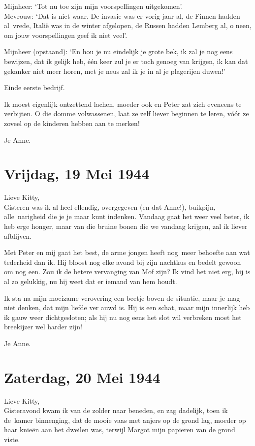 \documentclass{book}
\begin{document}
Mijnheer: `Tot nu toe zijn mijn voorspellingen uitgekomen'.\\Mevrouw:
`Dat is niet waar. De invasie was er vorig jaar al, de Finnen hadden
al~vrede, Italië was in de winter afgelopen, de Russen hadden Lemberg
al, o neen, om jouw voorspellingen geef ik niet veel'.

Mijnheer (opstaand): `En hou je nu eindelijk je grote bek, ik zal je nog
eens bewijzen, dat ik gelijk heb, één keer zul je er toch genoeg van
krijgen, ik kan dat gekanker niet meer horen, met je neus zal ik je in
al je plagerijen duwen!'

Einde eerste bedrijf.

Ik moest eigenlijk ontzettend lachen, moeder ook en Peter zat zich
eveneens te verbijten. O die domme volwassenen, laat ze zelf liever
beginnen te leren, vóór ze zoveel op de kinderen hebben aan te merken!

Je Anne.

\chapter{Vrijdag, 19 Mei 1944}

Lieve Kitty,\\Gisteren was ik al heel ellendig, overgegeven (en dat
Anne!), buikpijn, alle~narigheid die je je maar kunt indenken. Vandaag
gaat het weer veel beter, ik heb erge honger, maar van die bruine bonen
die we vandaag krijgen, zal ik liever afblijven.

Met Peter en mij gaat het best, de arme jongen heeft nog~meer behoefte
aan wat tederheid dan ik. Hij bloost nog elke avond bij zijn nachtkus en
bedelt gewoon om nog een. Zou ik de betere vervanging van Mof zijn? Ik
vind het niet erg, hij is al zo gelukkig, nu hij weet dat er iemand van
hem houdt.

Ik sta na mijn moeizame verovering een beetje boven de situatie, maar je
mag niet denken, dat mijn liefde ver auwd is. Hij is een schat, maar
mijn innerlijk heb ik gauw weer dichtgesloten; als hij nu nog eens het
slot wil verbreken moet het breekijzer wel harder zijn!

Je Anne.

\chapter{Zaterdag, 20 Mei 1944}

Lieve Kitty,\\Gisteravond kwam ik van de zolder naar beneden, en zag
dadelijk, toen ik de~kamer binnenging, dat de mooie vaas met anjers op
de grond lag, moeder op haar knieën aan het dweilen was, terwijl Margot
mijn papieren van de grond viste.
\end{document}
